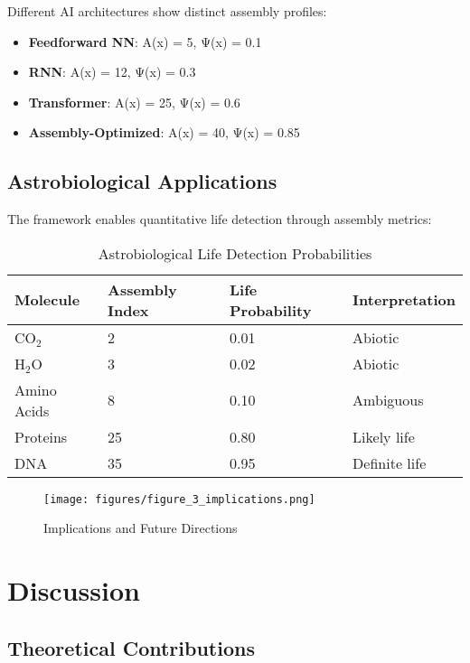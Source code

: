 \documentclass[11pt,a4paper]{article}
\begin{document}
Different AI architectures show distinct assembly profiles:

\begin{itemize}
    \item \textbf{Feedforward NN}: A(x) = 5, Ψ(x) = 0.1
    \item \textbf{RNN}: A(x) = 12, Ψ(x) = 0.3
    \item \textbf{Transformer}: A(x) = 25, Ψ(x) = 0.6
    \item \textbf{Assembly-Optimized}: A(x) = 40, Ψ(x) = 0.85
\end{itemize}

\subsection{Astrobiological Applications}
\label{subsec:astrobiology}

The framework enables quantitative life detection through assembly metrics:

\begin{table}[H]
\centering
\caption{Astrobiological Life Detection Probabilities}
\label{tab:astrobiology}
\begin{tabular}{@{}llll@{}}
\toprule
Molecule & Assembly Index & Life Probability & Interpretation \\
\midrule
CO$_2$ & 2 & 0.01 & Abiotic \\
H$_2$O & 3 & 0.02 & Abiotic \\
Amino Acids & 8 & 0.10 & Ambiguous \\
Proteins & 25 & 0.80 & Likely life \\
DNA & 35 & 0.95 & Definite life \\
\bottomrule
\end{tabular}
\end{table}

\begin{figure}[H]
\centering
\texttt{[image: figures/figure\_3\_implications.png]}
\caption{Implications and Future Directions}
\label{fig:implications}
\end{figure}

\section{Discussion}
\label{sec:discussion}

\subsection{Theoretical Contributions}
\label{subsec:theoretical}
\end{document}

